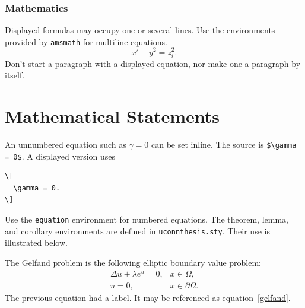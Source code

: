 \subsubsection{Mathematics}
Displayed formulas may occupy one or several lines. Use the environments
provided by \texttt{amsmath} for multiline equations.
\[
  x' + y^{2} = z_{i}^{2}.
\]
Don't start a paragraph with a displayed equation, nor make one a paragraph by
itself.


\section{Mathematical Statements}


An unnumbered equation such as $\gamma = 0$ can be set inline. The source is
\verb"$\gamma = 0$". A displayed version uses


\begin{verbatim}
\[
  \gamma = 0.
\]
\end{verbatim}


Use the \texttt{equation} environment for numbered equations. The theorem,
lemma, and corollary environments are defined in \texttt{uconnthesis.sty}.
Their use is illustrated below.


The Gelfand problem is the following elliptic boundary value problem:
\begin{equation}
  \label{gelfand}
  \begin{array}{rl}
    \Delta u + \lambda e^u = 0, &
    x \in \Omega,\\
    u=0, & x \in \partial\Omega.
  \end{array}
\end{equation}
The previous equation had a label. It may be referenced as
equation~\eqref{gelfand}.
